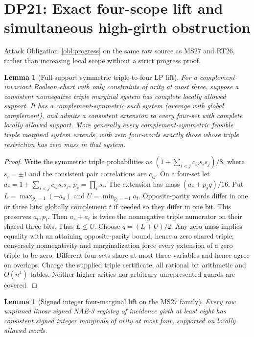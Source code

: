 \documentclass[11pt]{article}
\newtheorem{lemma}[theorem]{Lemma}
\begin{document}
\section{DP21: Exact four-scope lift and simultaneous high-girth obstruction}\label{sec:dp21}
Attack Obligation~\ref{obl:progress} on the same raw source as MS27 and RT26, rather than increasing local scope without a strict progress proof.
\begin{lemma}[Full-support symmetric triple-to-four LP lift]\label{lem:dp21-lp}
For a complement-invariant Boolean chart with only constraints of arity at most three, suppose a consistent nonnegative triple marginal system has complete locally allowed support. It has a complement-symmetric such system (average with global complement), and admits a consistent extension to every four-set with complete locally allowed support. More generally every complement-symmetric feasible triple marginal system extends, with zero four-words exactly those whose triple restriction has zero mass in that system.
\end{lemma}
\begin{proof}
Write the symmetric triple probabilities as $(1+\sum_{i<j}c_{ij}s_is_j)/8$, where $s_i=\pm1$ and the consistent pair correlations are $c_{ij}$. On a four-set let $a_s=1+\sum_{i<j}c_{ij}s_is_j$, $p_s=\prod_i s_i$. The extension has mass $(a_s+p_s q)/16$. Put $L=\max_{p_s=1}(-a_s)$ and $U=\min_{p_t=-1}a_t$. Opposite-parity words differ in one or three bits; globally complement $t$ if needed so they differ in one bit. This preserves $a_t,p_t$. Then $a_s+a_t$ is twice the nonnegative triple numerator on their shared three bits. Thus $L\le U$. Choose $q=(L+U)/2$. Any zero mass implies equality with an attaining opposite-parity bound, hence a zero shared triple; conversely nonnegativity and marginalization force every extension of a zero triple to be zero. Different four-sets share at most three variables and hence agree on overlaps. Charge the supplied triple certificate, all rational bit arithmetic and $O(n^4)$ tables. Neither higher arities nor arbitrary unrepresented guards are covered.
\end{proof}
\begin{lemma}[Signed integer four-marginal lift on the MS27 family]\label{lem:dp21-int}
Every raw unpinned linear signed NAE-3 registry of incidence girth at least eight has consistent signed integer marginals of arity at most four, supported on locally allowed words.
\end{lemma}
\end{document}
